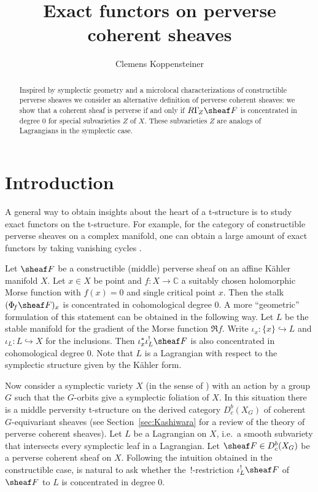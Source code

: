 \documentclass[english,biblatex-alpha,bw]{short-notes}
\title{Exact functors on perverse coherent sheaves}
\author{Clemens Koppensteiner}
\newcommand\lc[1]{\Gamma_{\mkern-3mu#1}}
\begin{document}
\maketitle

\begin{abstract}
    Inspired by symplectic geometry and a microlocal characterizations of constructible perverse sheaves we consider an alternative definition of perverse coherent sheaves:
    we show that a coherent sheaf is perverse if and only if $R\lc Z\sheaf F$ is concentrated in degree $0$ for special subvarieties $Z$ of $X$.
    These subvarieties $Z$ are analogs of Lagrangians in the symplectic case.
\end{abstract}

\section{Introduction}

A general way to obtain insights about the heart of a t-structure is to study exact functors on the t-structure.
For example, for the category of constructible perverse sheaves on a complex manifold, one can obtain a large amount of exact functors by taking vanishing cycles \cite[Corollary~10.3.13]{KashiwaraSchapira:1994:SheavesOnManifolds}.

Let $\sheaf F$ be a constructible (middle) perverse sheaf on an affine Kähler manifold $X$.
Let $x \in  X$ be point and $f\colon X \to  \mathbb{C}$ a suitably chosen holomorphic Morse function with $f(x) = 0$ and single critical point $x$.
Then the stalk $(\Phi _{\!f}\sheaf F)_x$ is concentrated in cohomological degree $0$.
A more \enquote{geometric} formulation of this statement can be obtained in the following way.
Let $L$ be the stable manifold for the gradient of the Morse function $\Re f$.
Write $\iota _x \colon \{x\} \hookrightarrow L$ and $\iota _L\colon L \hookrightarrow X$ for the inclusions.
Then $\iota _x^*\iota _L^! \sheaf F$ is also concentrated in cohomological degree $0$.
Note that $L$ is a Lagrangian with respect to the symplectic structure given by the Kähler form.

Now consider a symplectic variety $X$ (in the sense of \cite{Beauville:2000:SymplecticSingularities}) with an action by a group $G$ such that the $G$-orbits give a symplectic foliation of $X$.
In this situation there is a middle perversity t-structure on the derived category $D_c^b(X_G)$ of coherent $G$-equivariant sheaves (see Section~\ref{sec:Kashiwara} for a review of the theory of perverse coherent sheaves).
Let $L$ be a Lagrangian on $X$, i.e.\ a smooth subvariety that intersects every symplectic leaf in a Lagrangian.
Let $\sheaf F \in  D_c^b(X_G)$ be a perverse coherent sheaf on $X$.
Following the intuition obtained in the constructible case, is natural to ask whether the\ !-restriction $\iota _L^!\sheaf F$ of $\sheaf F$ to $L$ is concentrated in degree $0$.
\end{document}
